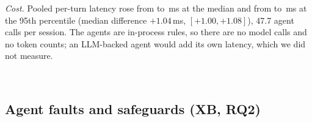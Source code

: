 \emph{Cost.} Pooled per-turn latency rose from \xaBzeroMed{} to \xaMoneMed{}\,ms at the median and from \xaBzeroHigh{} to \xaMoneHigh{}\,ms at the 95th percentile (median difference $+1.04$\,ms, $[+1.00,+1.08]$), 47.7 agent calls per session. The agents are in-process rules, so there are no model calls and no token counts; an LLM-backed agent would add its own latency, which we did not measure.

\begin{table}[tbp]
\centering\scriptsize\setlength{\tabcolsep}{3pt}
\caption{Registered predictions and outcomes. XA (above) and XB (below).}\label{tab:preds}
\\[2mm]

\end{table}

\subsection{Agent faults and safeguards (XB, RQ2)}
\begin{table}[tbp]
\centering\scriptsize\setlength{\tabcolsep}{3pt}
\caption{XB, 40 sessions per fault and variant (160 per fault over four variants). inj.: injected faulty or harmful outputs in the full variant; compl./auth./trans.: sessions completed, with authoritative scores, with valid transitions; bypass: sessions with a guardrail-overridable final action (full / arbitration removed); leak: sessions in which an ungrounded concept was emphasised (full / grounding removed); brk.: sessions in which the per-agent breaker opened (full); p95: pooled per-turn latency.}\label{tab:xb}
\resizebox{\textwidth}{!}{}
\end{table}
